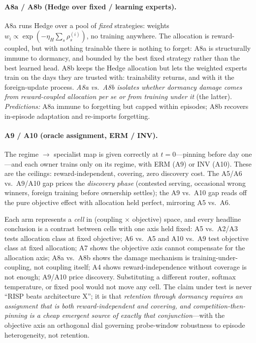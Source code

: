 \documentclass[11pt,a4paper]{article}
\theoremstyle{definition}
\theoremstyle{plain}
\newcommand{\nm}{\textsc{RISP}}
\begin{document}
\paragraph{A8a / A8b (Hedge over fixed / learning experts).} A8a runs Hedge
\citep{freund1997decision} over a pool of \emph{fixed} strategies: weights
$w_i \propto \exp(-\eta_H \sum_s \rho^{(i)}_s)$, no training anywhere. The
allocation is reward-coupled, but with nothing trainable there is nothing to
forget: A8a is structurally immune to dormancy, and bounded by the best
fixed strategy rather than the best learned head. A8b keeps the Hedge
allocation but lets the weighted experts train on the days they are trusted
with: trainability returns, and with it the foreign-update process.
\emph{A8a vs.\ A8b isolates whether dormancy damage comes from
reward-coupled allocation per se or from training under it} (the latter).
\emph{Predictions:} A8a immune to forgetting but capped within episodes;
A8b recovers in-episode adaptation and re-imports forgetting.

\paragraph{A9 / A10 (oracle assignment, ERM / INV).} The regime $\to$
specialist map is given correctly at $t = 0$---pinning before day one---and
each owner trains only on its regime, with ERM (A9) or INV (A10). These are
the ceilings: reward-independent, covering, zero discovery cost. The
A5/A6 vs.\ A9/A10 gap prices the \emph{discovery phase} (contested serving,
occasional wrong winners, foreign training before ownership settles); the
A9 vs.\ A10 gap reads off the pure objective effect with allocation held
perfect, mirroring A5 vs.\ A6.

\begin{keypoint}[title={The arms are an experiment about classes, not architectures}]
Each arm represents a \emph{cell} in (coupling $\times$ objective) space,
and every headline conclusion is a contrast between cells with one axis held
fixed: A5 vs.\ A2/A3 tests allocation class at fixed objective; A6 vs.\ A5
and A10 vs.\ A9 test objective class at fixed allocation; A7 shows the
objective axis cannot compensate for the allocation axis; A8a vs.\ A8b shows
the damage mechanism is training-under-coupling, not coupling itself; A4
shows reward-independence without coverage is not enough; A9/A10 price
discovery. Substituting a different router, softmax temperature, or fixed
pool would not move any cell. The claim under test is never ``\nm{} beats
architecture X''; it is that \emph{retention through dormancy requires an
assignment that is both reward-independent and covering, and
competition-then-pinning is a cheap emergent source of exactly that
conjunction}---with the objective axis an orthogonal dial governing
probe-window robustness to episode heterogeneity, not retention.
\end{keypoint}
\end{document}
